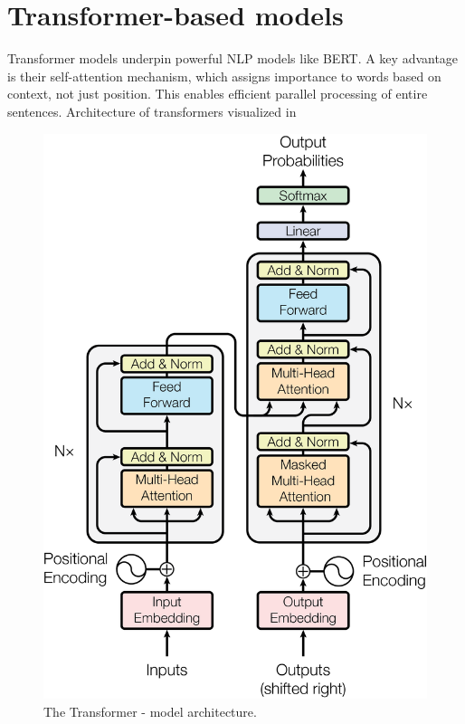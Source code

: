 \section{Transformer-based models}
Transformer models \cite{vaswani2023attention} \nocite{umarjamilai} underpin powerful \ac{NLP} models like \ac{BERT}.
A key advantage is their self-attention mechanism, which assigns importance to words based on context, not just position.
This enables efficient parallel processing of entire sentences.
Architecture of transformers visualized in 

\begin{figure}[h]
    \centering
    \includegraphics[scale=0.6]{src/fig/imgs/transformer_arch.png}
    \caption{The Transformer - model architecture.}
    \label{fig:model-arch}
\end{figure}

